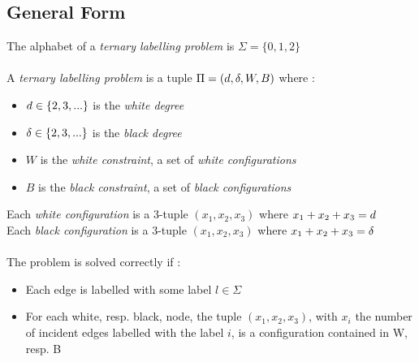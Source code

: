 \subsection{General Form}
The alphabet of a \textit{ternary labelling problem} is $\Sigma = \{0,1,2\}$\\\\
A \textit{ternary labelling problem} is a tuple $\Pi = (d,\delta,W,B)$ where :
\begin{itemize}
    \item $d\in\{2,3,...\}$ is the \textit{white degree}
    \item $\delta\in\{2,3,...\}$ is the \textit{black degree}
    \item $W$ is the \textit{white constraint}, a set of \textit{white configurations}
    \item $B$ is the \textit{black constraint}, a set of \textit{black configurations}
\end{itemize}
Each \textit{white configuration} is a 3-tuple $(x_1,x_2,x_3)$ where $x_1+x_2+x_3 = d$\\
Each \textit{black configuration} is a 3-tuple $(x_1,x_2,x_3)$ where $x_1+x_2+x_3 = \delta$\\\\
The problem is solved correctly if :
\begin{itemize}
    \item Each edge is labelled with some label $l\in\Sigma$
    \item For each white, resp. black, node, the tuple $(x_1,x_2, x_3)$, with $x_i$ the number of incident edges labelled with the label $i$, is a configuration contained in W, resp. B
\end{itemize}

